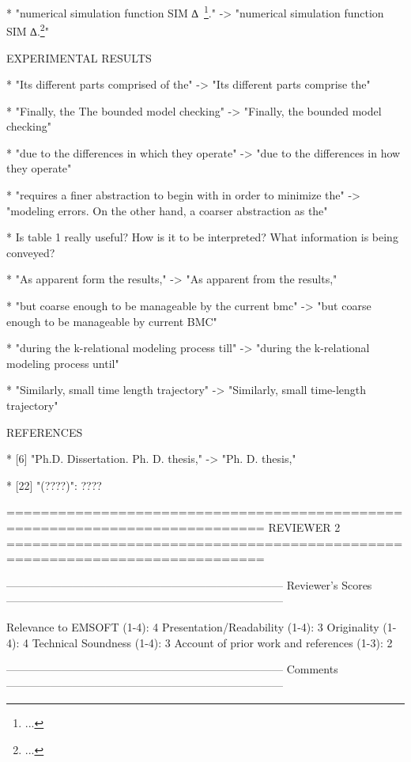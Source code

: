 * "numerical simulation function SIM ∆~\footnote{...}."
-> "numerical simulation function SIM ∆.\footnote{...}"

EXPERIMENTAL RESULTS

* "Its different parts comprised of the"
-> "Its different parts comprise the"

* "Finally, the The bounded model checking"
-> "Finally, the bounded model checking"

* "due to the differences in which they operate"
-> "due to the differences in how they operate"

* "requires a finer abstraction to begin with in order to minimize the"
-> "modeling errors. On the other hand, a coarser abstraction as the"

* Is table 1 really useful? How is it to be interpreted? What information is
  being conveyed?

* "As apparent form the results,"
-> "As apparent from the results,"

* "but coarse enough to be manageable by the current bmc"
-> "but coarse enough to be manageable by current BMC"

* "during the k-relational modeling process till"
-> "during the k-relational modeling process until"

* "Similarly, small time length trajectory"
-> "Similarly, small time-length trajectory"

REFERENCES

* [6] "Ph.D. Dissertation. Ph. D. thesis," -> "Ph. D. thesis,"

* [22] "(????)": ????

============================================================================
                            REVIEWER 2
============================================================================


---------------------------------------------------------------------------
Reviewer's Scores
---------------------------------------------------------------------------

               Relevance to EMSOFT (1-4): 4
          Presentation/Readability (1-4): 3
                       Originality (1-4): 4
               Technical Soundness (1-4): 3
Account of prior work and references (1-3): 2


---------------------------------------------------------------------------
Comments
---------------------------------------------------------------------------

